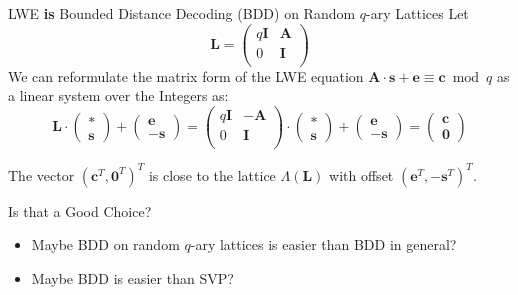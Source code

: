 \documentclass[xcolor=table,10pt,aspectratio=169]{beamer}
\renewcommand{\vec}[1]{\ensuremath{\mathbf{#1}}\xspace}
\newcommand{\mat}[1]{\ensuremath{\vec{#1}}\xspace}
\begin{document}
\begin{frame}[label={sec:org24759e7}]{LWE \textbf{is} Bounded Distance Decoding (BDD) on Random \(q\)-ary Lattices}
Let
\[
\mat{L} =  \begin{pmatrix}
    q\mat{I} & \mat{A}\\
    0 & \mat{I}\\
  \end{pmatrix}
\]
We can reformulate the matrix form of the LWE equation \(\vec{A} \cdot \vec{s} + \vec{e} \equiv \vec{c} \bmod q\) as a linear system over the Integers as:
\[
  \mat{L} \cdot
  \begin{pmatrix}
    \vec{*}\\
    \vec{s}
  \end{pmatrix} +
  \begin{pmatrix}
    \vec{e}\\
    -\vec{s}
  \end{pmatrix}  
 = 
  \begin{pmatrix}
    q\mat{I} & -\mat{A}\\
    0 & \mat{I}\\
  \end{pmatrix} \cdot
  \begin{pmatrix}
    \vec{*}\\
    \vec{s}
  \end{pmatrix} +
  \begin{pmatrix}
    \vec{e}\\
    -\vec{s}
  \end{pmatrix}  
= 
  \begin{pmatrix}
    \vec{c}\\
    \vec{0}
  \end{pmatrix}
\]

The vector \((\vec{c}^T, \vec{0}^T)^T\) is close to the lattice \(\Lambda\left(\mat{L}\right)\) with offset \((\vec{e}^T, -\vec{s}^T)^T\).
\end{frame}


\begin{frame}[label={sec:org561cd12}]{Is that a Good Choice?}
\begin{itemize}
\item Maybe BDD on random \(q\)-ary lattices is easier than BDD in general?
\item Maybe BDD is easier than SVP?
\end{itemize}
\end{frame}
\end{document}
